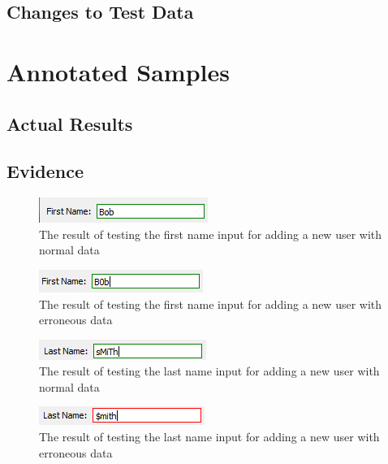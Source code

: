 \subsection{Changes to Test Data}

\section{Annotated Samples}

\subsection{Actual Results}

\subsection{Evidence}
\begin{figure}[H]
	\includegraphics{./testing/images/test_1_1_first_name_input_normal.png}
	\caption{The result of testing the first name input for adding a new user with normal data} \label{fig:test_1.1_result}
\end{figure}
	
\begin{figure}[H]
	\includegraphics{./testing/images/test_1_2_first_name_input_erroneous.png}
	\caption{The result of testing the first name input for adding a new user with erroneous data} \label{fig:test_1.2_result}
\end{figure}

\begin{figure}[H]
	\includegraphics{./testing/images/test_1_3_last_name_input_normal.png} 
	\caption{The result of testing the last name input for adding a new user with normal data} \label{fig:test_1.3_result}
\end{figure}

\begin{figure}[H]
	\includegraphics{./testing/images/test_1_4_last_name_input_erroneous.png}
	\caption{The result of testing the last name input for adding a new user with erroneous data} \label{fig:test_1.4_result}
\end{figure}

